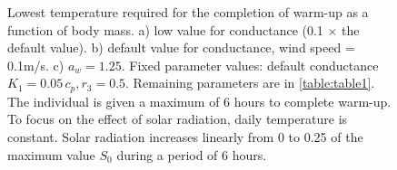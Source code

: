%
%
\begin{figure}[H]
\begin{center}
\caption{
	Lowest temperature required for the completion of warm-up as a function of body mass.
	a)  low value for conductance (0.1 $\times$ the default value).
	b) default value for conductance, wind speed  = 0.1m/s.
	c)  $a_w = 1.25$.
	Fixed parameter values: default conductance $K_1 = 0.05 \, c_p, r_3 = 0.5$.
	Remaining parameters are in \cref{table:table1}.
	The individual is given a maximum of 6 hours to complete warm-up.
	To focus on the effect of solar radiation, daily temperature is constant.
	Solar radiation increases linearly from 0 to 0.25 of the maximum value $S_0$ during a period of 6 hours.
}%
\label{fig3}
\end{center}
\end{figure}
